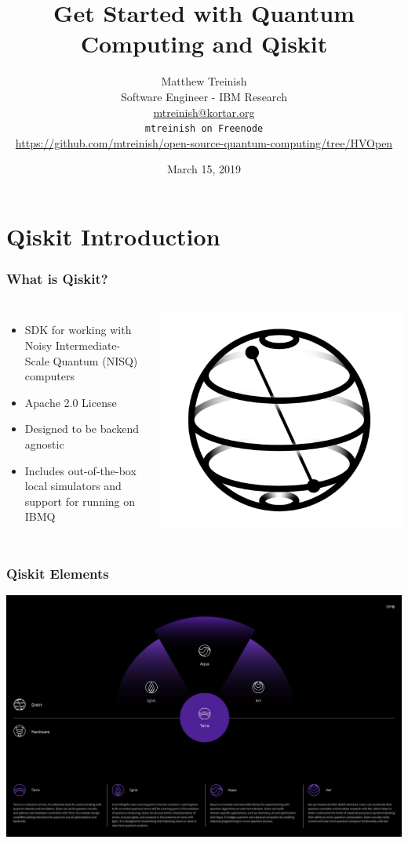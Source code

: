 \documentclass[aspectratio=169,11pt,hyperref={colorlinks=true}]{beamer}
\author[Matthew Treinish]{%
    \texorpdfstring{%
        \centering
        Matthew Treinish\\
        Software Engineer - IBM Research\\
        \href{mailto:mtreinish@kortar.org}{mtreinish@kortar.org}\\
        \texttt{mtreinish on Freenode}\\
        \href{https://github.com/mtreinish/open-source-quantum-computing/tree/HVOpen}{https://github.com/mtreinish/open-source-quantum-computing/tree/HVOpen}
   }
   {Matthew Treinish}
}
\date{March 15, 2019}
\title{Get Started with Quantum Computing and Qiskit}
\begin{document}
\titlepage
\section{Qiskit Introduction}
\begin{frame}
    \frametitle{What is Qiskit?}
    \begin{columns}
            \begin{itemize}
                \item SDK for working with Noisy Intermediate-Scale Quantum (NISQ) computers
                \item Apache 2.0 License
                \item Designed to be backend agnostic
                \item Includes out-of-the-box local simulators and support for running on IBMQ
            \end{itemize}
            \includegraphics[width=\textwidth]{qiskit_logo.png}
    \end{columns}
\end{frame}

\begin{frame}
    \frametitle{Qiskit Elements}
    \centering
    \includegraphics[width=.99\textwidth]{qiskit-components.jpeg}
\end{frame}
\end{document}
